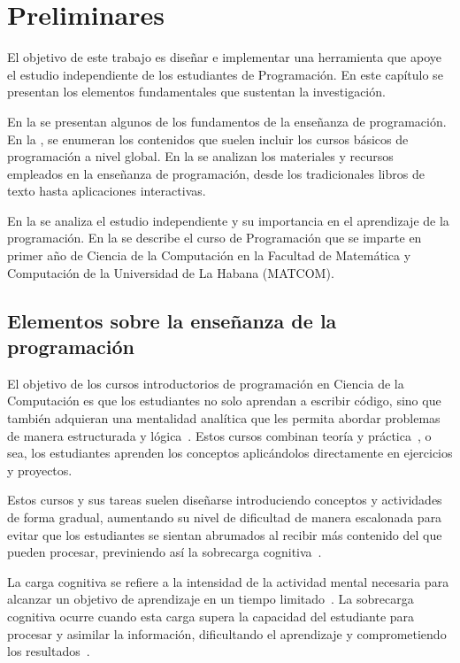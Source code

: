 \chapter{Preliminares}\label{chapter:background}

El objetivo de este trabajo es diseñar e implementar una herramienta que apoye el estudio independiente de los estudiantes de Programación. En este capítulo se presentan los elementos fundamentales que sustentan la investigación.

En la  se presentan algunos de los fundamentos de la enseñanza de programación. En la , se enumeran los contenidos que suelen incluir los cursos básicos de programación a nivel global. En la  se analizan los materiales y recursos empleados en la enseñanza de programación, desde los tradicionales libros de texto hasta aplicaciones interactivas.

En la  se analiza el estudio independiente y su importancia en el aprendizaje de la programación. En la  se describe el curso de Programación que se imparte en primer año de Ciencia de la Computación en la Facultad de Matemática y Computación de la Universidad de La Habana (\mbox{MATCOM}).

\section{Elementos sobre la enseñanza de la programación}\label{sec:ensenanza_programacion}

El objetivo de los cursos introductorios de programación en Ciencia de la Computación es que los estudiantes no solo aprendan a escribir código, sino que también adquieran una mentalidad analítica que les permita abordar problemas de manera estructurada y lógica~\cite{JOHNLEMAY2021100056}. Estos cursos combinan teoría y práctica~\cite{Sarsa_2022}, o sea, los estudiantes aprenden los conceptos aplicándolos directamente en ejercicios y proyectos.

Estos cursos y sus tareas suelen diseñarse introduciendo conceptos y actividades de forma gradual, aumentando su nivel de dificultad de manera escalonada para evitar que los estudiantes se sientan abrumados al recibir más contenido del que pueden procesar, previniendo así la sobrecarga cognitiva~\cite{duran2021clt}.

La carga cognitiva se refiere a la intensidad de la actividad mental necesaria para alcanzar un objetivo de aprendizaje en un tiempo limitado~\cite{duran2021clt}. La sobrecarga cognitiva ocurre cuando esta carga supera la capacidad del estudiante para procesar y asimilar la información, dificultando el aprendizaje y comprometiendo los resultados~\cite{duran2021clt}. 

